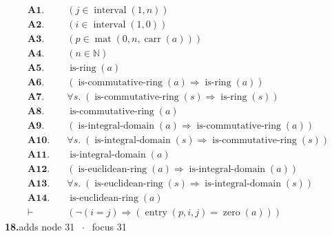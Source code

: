 \documentclass[11pt]{article}
\theoremstyle{plain}
\newcommand{\fit}[1]{\resizebox{\ifdim\width>\linewidth\linewidth\else\width\fi}{!}{#1}}
\begin{document}
\begin{align*}
  \mathbf{A1.}\quad & (j \in \operatorname{interval}(1, n)) \\
  \mathbf{A2.}\quad & (i \in \operatorname{interval}(1, 0)) \\
  \mathbf{A3.}\quad & (p \in \operatorname{mat}(0, n, \operatorname{carr}(a))) \\
  \mathbf{A4.}\quad & (n \in \mathbb{N}) \\
  \mathbf{A5.}\quad & \operatorname{is\text{-}ring}(a) \\
  \mathbf{A6.}\quad & (\operatorname{is\text{-}commutative\text{-}ring}(a) \Rightarrow \operatorname{is\text{-}ring}(a)) \\
  \mathbf{A7.}\quad & \forall s.\; (\operatorname{is\text{-}commutative\text{-}ring}(s) \Rightarrow \operatorname{is\text{-}ring}(s)) \\
  \mathbf{A8.}\quad & \operatorname{is\text{-}commutative\text{-}ring}(a) \\
  \mathbf{A9.}\quad & (\operatorname{is\text{-}integral\text{-}domain}(a) \Rightarrow \operatorname{is\text{-}commutative\text{-}ring}(a)) \\
  \mathbf{A10.}\quad & \forall s.\; (\operatorname{is\text{-}integral\text{-}domain}(s) \Rightarrow \operatorname{is\text{-}commutative\text{-}ring}(s)) \\
  \mathbf{A11.}\quad & \operatorname{is\text{-}integral\text{-}domain}(a) \\
  \mathbf{A12.}\quad & (\operatorname{is\text{-}euclidean\text{-}ring}(a) \Rightarrow \operatorname{is\text{-}integral\text{-}domain}(a)) \\
  \mathbf{A13.}\quad & \forall s.\; (\operatorname{is\text{-}euclidean\text{-}ring}(s) \Rightarrow \operatorname{is\text{-}integral\text{-}domain}(s)) \\
  \mathbf{A14.}\quad & \operatorname{is\text{-}euclidean\text{-}ring}(a) \\
  \vdash\quad & (\neg (i = j) \Rightarrow (\operatorname{entry}(p, i, j) = \operatorname{zero}(a)))
\end{align*}
\medskip\noindent\textbf{18.}\quad \fit{\texttt{(di)}}\hfill{\small adds node 31 $\;\cdot\;$ focus 31}\\[2pt]
\end{document}
